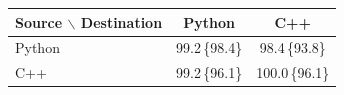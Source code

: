 \begin{tabular}{lcc}\toprule
Source $\backslash$ Destination & Python & C++\\\midrule
Python & 99.2\,\{98.4\} & 98.4\,\{93.8\}\\
C++ & 99.2\,\{96.1\} & 100.0\,\{96.1\}\\
\bottomrule\end{tabular}

